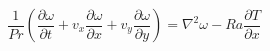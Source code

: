 \documentclass[preview]{standalone}
\begin{document}
\setcounter{equation}{2}
\begin{equation}
    \frac{1}{Pr} \left( \frac{\partial \omega}{\partial t} + v_x \frac{\partial \omega}{\partial x} + v_y \frac{\partial \omega}{\partial y} \right) =
     \nabla^2 \omega - Ra \frac{\partial T}{\partial x}
\end{equation}
\end{document}
